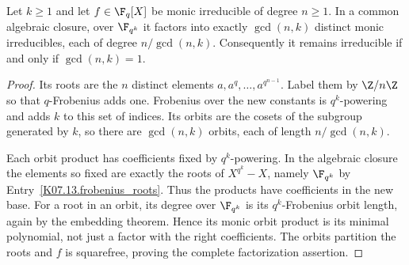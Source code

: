 \begin{theorem}
Let $k\geq1$ and let $f\in\F_q[X]$ be monic irreducible of degree $n\geq1$. In a common algebraic closure, over $\F_{q^k}$ it factors into exactly $\gcd(n,k)$ distinct monic irreducibles, each of degree $n/\gcd(n,k)$. Consequently it remains irreducible if and only if $\gcd(n,k)=1$.
\end{theorem}
\begin{proof}
Its roots are the $n$ distinct elements $a,a^q,\ldots,a^{q^{n-1}}$. Label them by $\Z/n\Z$ so that $q$-Frobenius adds one. Frobenius over the new constants is $q^k$-powering and adds $k$ to this set of indices. Its orbits are the cosets of the subgroup generated by $k$, so there are $\gcd(n,k)$ orbits, each of length $n/\gcd(n,k)$.

Each orbit product has coefficients fixed by $q^k$-powering. In the algebraic closure the elements so fixed are exactly the roots of $X^{q^k}-X$, namely $\F_{q^k}$ by Entry~\ref{K07.13.frobenius_roots}. Thus the products have coefficients in the new base. For a root in an orbit, its degree over $\F_{q^k}$ is its $q^k$-Frobenius orbit length, again by the embedding theorem. Hence its monic orbit product is its minimal polynomial, not just a factor with the right coefficients. The orbits partition the roots and $f$ is squarefree, proving the complete factorization assertion.
\end{proof}

